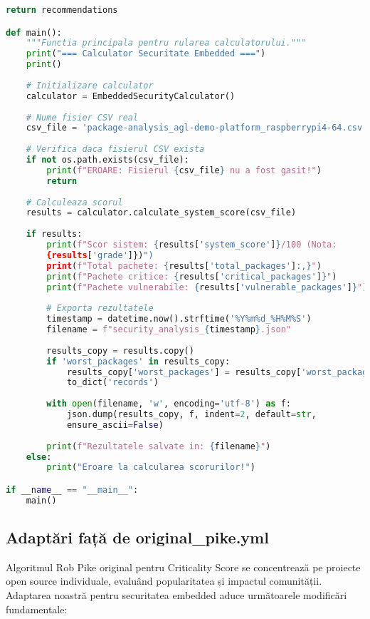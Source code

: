 \documentclass[12pt,a4paper]{article}
\begin{document}
\begin{lstlisting}[language=Python, caption=Script final pentru calcularea scorului de securitate (fără simulări), label=lst:final_security_calculator]
        return recommendations

def main():
    """Functia principala pentru rularea calculatorului."""
    print("=== Calculator Securitate Embedded ===")
    print()
    
    # Initializare calculator
    calculator = EmbeddedSecurityCalculator()
    
    # Nume fisier CSV real
    csv_file = 'package-analysis_agl-demo-platform_raspberrypi4-64.csv'
    
    # Verifica daca fisierul CSV exista
    if not os.path.exists(csv_file):
        print(f"EROARE: Fisierul {csv_file} nu a fost gasit!")
        return
    
    # Calculeaza scorul
    results = calculator.calculate_system_score(csv_file)
    
    if results:
        print(f"Scor sistem: {results['system_score']}/100 (Nota:
        {results['grade']})")
        print(f"Total pachete: {results['total_packages']:,}")
        print(f"Pachete critice: {results['critical_packages']}")
        print(f"Pachete vulnerabile: {results['vulnerable_packages']}")
        
        # Exporta rezultatele
        timestamp = datetime.now().strftime('%Y%m%d_%H%M%S')
        filename = f"security_analysis_{timestamp}.json"
        
        results_copy = results.copy()
        if 'worst_packages' in results_copy:
            results_copy['worst_packages'] = results_copy['worst_packages'].
            to_dict('records')
        
        with open(filename, 'w', encoding='utf-8') as f:
            json.dump(results_copy, f, indent=2, default=str, 
            ensure_ascii=False)
        
        print(f"Rezultatele salvate in: {filename}")
    else:
        print("Eroare la calcularea scorurilor!")

if __name__ == "__main__":
    main()
\end{lstlisting}

\subsection{Adaptări față de original\_pike.yml}

Algoritmul Rob Pike original pentru Criticality Score se concentrează pe proiecte open source individuale, evaluând popularitatea și impactul comunității. Adaptarea noastră pentru securitatea embedded aduce următoarele modificări fundamentale:
\end{document}
